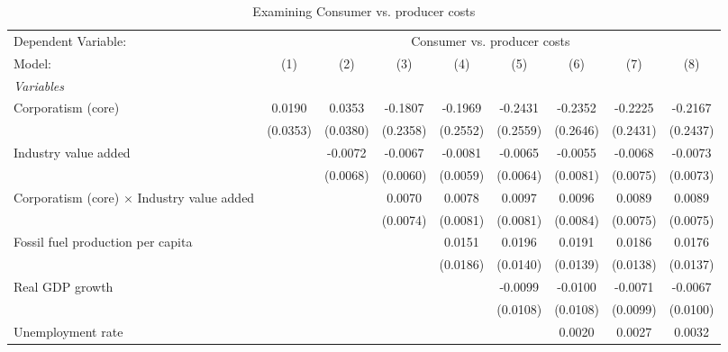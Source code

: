 
\begin{table}[htbp]
   \caption{Examining Consumer vs. producer costs}
   \centering
   \begin{tabular}{lcccccccc}
      \tabularnewline \midrule \midrule
      Dependent Variable: & \multicolumn{8}{c}{Consumer vs. producer costs}\\
      Model:                                            & (1)      & (2)      & (3)      & (4)      & (5)      & (6)      & (7)      & (8)\\  
      \midrule
      \emph{Variables}\\
      Corporatism (core)                                & 0.0190   & 0.0353   & -0.1807  & -0.1969  & -0.2431  & -0.2352  & -0.2225  & -0.2167\\   
                                                        & (0.0353) & (0.0380) & (0.2358) & (0.2552) & (0.2559) & (0.2646) & (0.2431) & (0.2437)\\   
      Industry value added                              &          & -0.0072  & -0.0067  & -0.0081  & -0.0065  & -0.0055  & -0.0068  & -0.0073\\   
                                                        &          & (0.0068) & (0.0060) & (0.0059) & (0.0064) & (0.0081) & (0.0075) & (0.0073)\\   
      Corporatism (core) $\times$ Industry value added  &          &          & 0.0070   & 0.0078   & 0.0097   & 0.0096   & 0.0089   & 0.0089\\   
                                                        &          &          & (0.0074) & (0.0081) & (0.0081) & (0.0084) & (0.0075) & (0.0075)\\   
      Fossil fuel production per capita                 &          &          &          & 0.0151   & 0.0196   & 0.0191   & 0.0186   & 0.0176\\   
                                                        &          &          &          & (0.0186) & (0.0140) & (0.0139) & (0.0138) & (0.0137)\\   
      Real GDP growth                                   &          &          &          &          & -0.0099  & -0.0100  & -0.0071  & -0.0067\\   
                                                        &          &          &          &          & (0.0108) & (0.0108) & (0.0099) & (0.0100)\\   
      Unemployment rate                                 &          &          &          &          &          & 0.0020   & 0.0027   & 0.0032\\   

\end{tabular}
\end{table}
